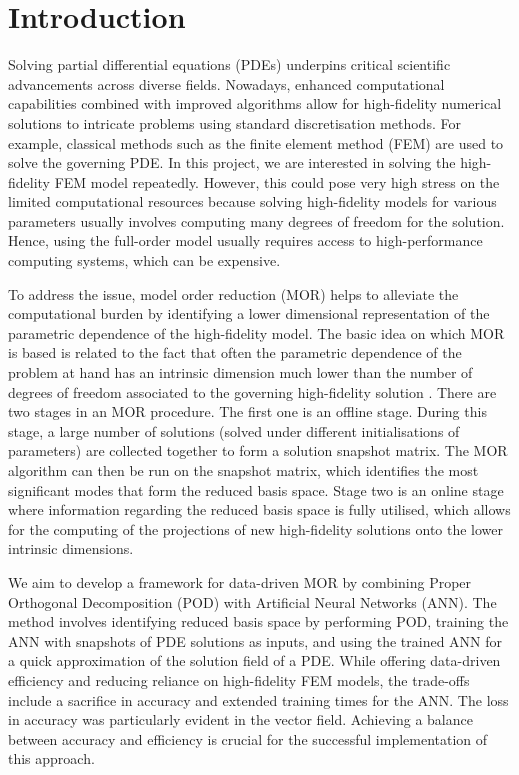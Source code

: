 \section{Introduction}
Solving partial differential equations (PDEs) underpins critical scientific advancements across diverse fields. Nowadays, enhanced computational capabilities combined with improved algorithms allow for high-fidelity numerical solutions to intricate problems using standard discretisation methods. For example, classical methods such as the finite element method (FEM) are used to solve the governing PDE. In this project, we are interested in solving the high-fidelity FEM model repeatedly. However, this could pose very high stress on the limited computational resources because solving high-fidelity models for various parameters usually involves computing many degrees of freedom for the solution. Hence, using the full-order model usually requires access to high-performance computing systems, which can be expensive. 

To address the issue, model order reduction (MOR) helps to alleviate the computational burden by identifying a lower dimensional representation of the parametric dependence of the high-fidelity model. The basic idea on which MOR is based is related to the fact that often the parametric dependence of the problem at hand has an intrinsic dimension much lower than the number of degrees of freedom associated to the governing high-fidelity solution \cite{shah2022finite}. There are two stages in an MOR procedure. The first one is an offline stage. During this stage, a large number of solutions (solved under different initialisations of parameters) are collected together to form a solution snapshot matrix. The MOR algorithm can then be run on the snapshot matrix, which identifies the most significant modes that form the reduced basis space. Stage two is an online stage where information regarding the reduced basis space is fully utilised, which allows for the computing of the projections of new high-fidelity solutions onto the lower intrinsic dimensions. 

We aim to develop a framework for data-driven MOR by combining Proper Orthogonal Decomposition (POD) with Artificial Neural Networks (ANN)\cite{hesthaven2018non}. The method involves identifying reduced basis space by performing POD, training the ANN with snapshots of PDE solutions as inputs, and using the trained ANN for a quick approximation of the solution field of a PDE. While offering data-driven efficiency and reducing reliance on high-fidelity FEM models, the trade-offs include a sacrifice in accuracy and extended training times for the ANN. The loss in accuracy was particularly evident in the vector field. Achieving a balance between accuracy and efficiency is crucial for the successful implementation of this approach.

